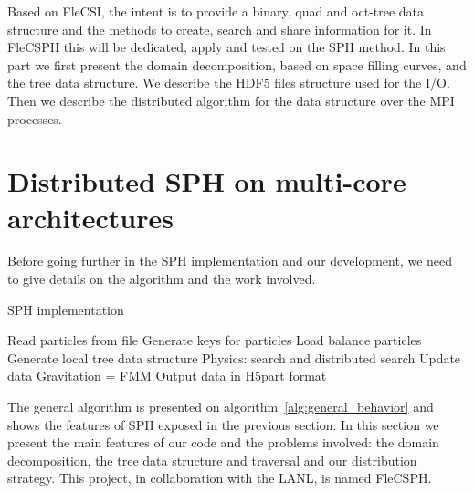 Based on FleCSI, the intent is to provide a binary, quad and oct-tree data structure and the methods to create, search and share information for it. 
In FleCSPH this will be dedicated, apply and tested on the SPH method. 
In this part we first present the domain decomposition, based on space filling curves, and the tree data structure.
We describe the HDF5 files structure used for the I/O.
Then we describe the distributed algorithm for the data structure over the MPI processes. 

\section{Distributed SPH on multi-core architectures}
Before going further in the SPH implementation and our development, we need to give details on the algorithm and the work involved. 
%
\begin{algorithm}
\caption{SPH implementation}\label{alg:general_behavior}
\begin{algorithmic}[1]
\State Read particles from file 
\State Generate keys for particles 
\State Load balance particles 
\State Generate local tree data structure
\State Physics: search and distributed search
\State Update data 
\EndWhile
\State Gravitation = FMM
\State Output data in H5part format
\EndIf
\EndWhile
\end{algorithmic}
\end{algorithm}
%
The general algorithm is presented on algorithm~\ref{alg:general_behavior} and shows the features of SPH exposed in the previous section. 
In this section we present the main features of our code and the problems involved: the domain decomposition, the tree data structure and traversal and our distribution strategy. 
This project, in collaboration with the LANL, is named FleCSPH. 

